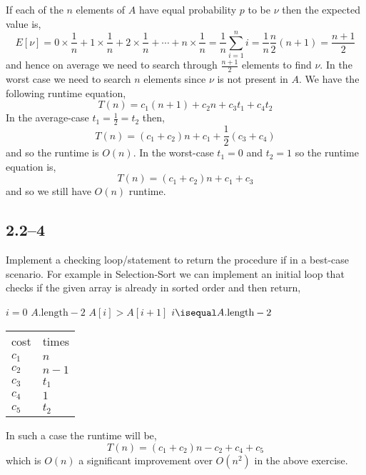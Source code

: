 If each of the $n$ elements of $A$ have equal probability $p$ to be $\nu$ then the expected value is,
\begin{equation*}
	E[\nu] = 0\times\frac{1}{n}+1\times\frac{1}{n} + 2\times\frac{1}{n} + \cdots + n\times\frac{1}{n} = \frac{1}{n}\sum_{i=1}^{n}i = \frac{1}{n}\frac{n}{2}(n+1) = \frac{n+1}{2}
\end{equation*}
and hence on average we need to search through $\frac{n+1}{2}$ elements to find $\nu$. In the worst case we need to search $n$ elements since $\nu$ is not present in $A$. We have the following runtime equation,
\begin{equation*}
	T(n) = c_{1}(n+1) + c_{2}n + c_{3}t_{1} + c_{4}t_{2}
\end{equation*}
In the average-case $t_{1}=\frac{1}{2}=t_{2}$ then,
\begin{equation*}
	T(n) = (c_{1} + c_{2})n + c_{1} + \frac{1}{2}(c_{3} + c_{4})
\end{equation*}
and so the runtime is $O(n)$. In the worst-case $t_{1}=0$ and $t_{2}=1$ so the runtime equation is,
\begin{equation*}
	T(n) = (c_{1} + c_{2})n + c_{1} + c_{3}
\end{equation*}
and so we still have $O(n)$ runtime.

\subsection*{2.2--4}

Implement a checking loop/statement to return the procedure if in a best-case scenario. For example in Selection-Sort we can implement an initial loop that checks if the given array is already in sorted order and then return,
\begin{multicols}{2}
	\begin{codebox}
		\Procname{}
		\li \For $i = 0$ \To $A.\text{length}-2$
		\li \Do
					\If $A[i] > A[i+1]$
		\li		\Then
						\Break
					\End
				\End
		\li \If $i \isequal A.\text{length}-2$
		\li \Then
					\Return
				\End
	\end{codebox}
	\begin{tabular}{ l l }
		cost & times\\
		$c_{1}$ & $n$\\
		$c_{2}$ & $n-1$\\
		$c_{3}$ & $t_{1}$\\
		$c_{4}$ & $1$\\
		$c_{5}$ & $t_{2}$
	\end{tabular}
\end{multicols}
In such a case the runtime will be,
\begin{equation*}
	T(n) = (c_{1}+c_{2})n - c_{2} + c_{4} + c_{5}
\end{equation*}
which is $O(n)$ a significant improvement over $O(n^{2})$ in the above exercise.

